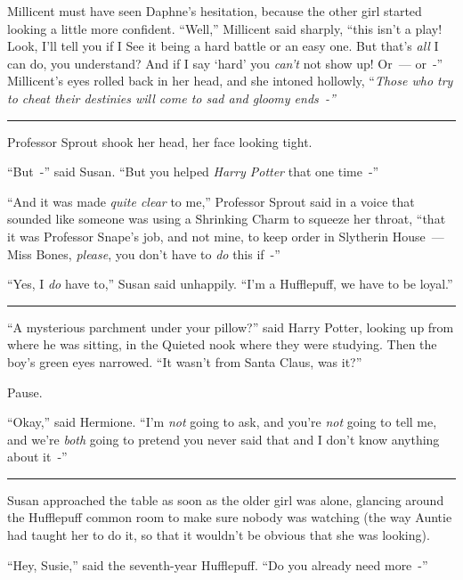 Millicent must have seen Daphne's hesitation, because the other girl started looking a little more confident. ``Well,'' Millicent said sharply, ``this isn't a play! Look, I'll tell you if I See it being a hard battle or an easy one. But that's \emph{all} I can do, you understand? And if I say `hard' you \emph{can't} not show up! Or~--- or~-'' Millicent's eyes rolled back in her head, and she intoned hollowly, ``\emph{Those who try to cheat their destinies will come to sad and gloomy ends~-''}

\begin{center}\rule{3in}{0.4pt}\end{center}

Professor Sprout shook her head, her face looking tight.

``But~-'' said Susan. ``But you helped \emph{Harry Potter} that one time~-''

``And it was made \emph{quite clear} to me,'' Professor Sprout said in a voice that sounded like someone was using a Shrinking Charm to squeeze her throat, ``that it was Professor Snape's job, and not mine, to keep order in Slytherin House~--- Miss Bones, \emph{please}, you don't have to \emph{do} this if~-''

``Yes, I \emph{do} have to,'' Susan said unhappily. ``I'm a Hufflepuff, we have to be loyal.''

\begin{center}\rule{3in}{0.4pt}\end{center}

``A mysterious parchment under your pillow?'' said Harry Potter, looking up from where he was sitting, in the Quieted nook where they were studying. Then the boy's green eyes narrowed. ``It wasn't from Santa Claus, was it?''

Pause.

``Okay,'' said Hermione. ``I'm \emph{not} going to ask, and you're \emph{not} going to tell me, and we're \emph{both} going to pretend you never said that and I don't know anything about it~-''

\begin{center}\rule{3in}{0.4pt}\end{center}

Susan approached the table as soon as the older girl was alone, glancing around the Hufflepuff common room to make sure nobody was watching (the way Auntie had taught her to do it, so that it wouldn't be obvious that she was looking).

``Hey, Susie,'' said the seventh-year Hufflepuff. ``Do you already need more~-''


